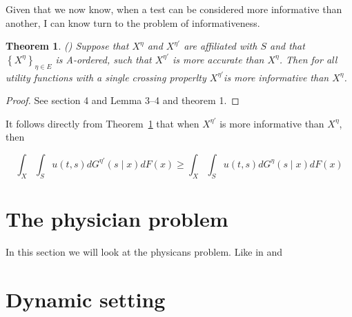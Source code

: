 \documentclass[10pt,a4paper]{article} %
\newtheorem{thm}{Theorem}[section]
\theoremstyle{definition}
\theoremstyle{remark}
\begin{document}
Given that we now know, when a test can be considered more informative than another, I can know turn to the problem of informativeness.

\begin{thm}
\label{thm:informative}
(\citet{Persico2000}) 
Suppose that $X^{\eta}$ and $X^{\eta'}$ are affiliated with $S$ and that $\left\{ X^{\eta}\right\} _{\eta\in E}$ is A-ordered, such that $X^{\eta'}$ is more accurate than $X^{\eta}$. Then for all utility functions with a single crossing properlty $X^{\eta'}$is more informative than $X^{\eta}$.
\end{thm}

\begin{proof}
See \citet{Lehmann1988} section 4 and \citet{Karlin1956} Lemma 3--4 and theorem 1.
\end{proof}

It follows directly from Theorem~\ref{thm:informative} that when $X^{\eta'}$ is more informative than $X^{\eta}$, then

\[
\int_{X}\int_{S}u(t,s)dG^{\eta'}(s\mid x)dF(x)\ge\int_{X}\int_{S}u(t,s)dG^{\eta}(s\mid x)dF(x)
\]


\section{The physician problem}

In this section we will look at the physicans problem. Like in \citet{Allard2009} and \citet{Weiss1996}

\section{Dynamic setting}

\printbibliography 
\end{document}
